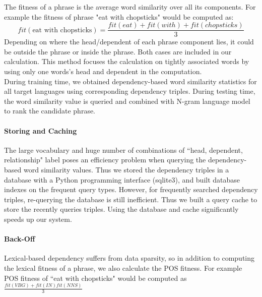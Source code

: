 \documentclass[11pt]{article}
\begin{document}
The fitness of a phrase is the average word similarity over all its components. For example the fitness of phrase "eat with chopsticks" would be computed as:
\begin{equation}
fit(\mbox{eat with chopsticks}) = \frac{fit(eat) + fit(with) + fit(chopsticks) } {3}
\end{equation}
Depending on where the head/dependent of each phrase component lies, it could be outside the phrase or inside the phrase. Both cases are included in our calculation. 
This method focuses the calculation on tightly associated words by using only one words's head and dependent in the computation.\\ 
During training time, we obtained dependency-based word similarity statistics for all target languages using corresponding dependency triples. During testing time, the word similarity value is queried and combined with N-gram language model to rank the candidate phrase. \\

\paragraph{Storing and Caching}
The large vocabulary and huge number of combinations of ``head, dependent, relationship" label poses an efficiency problem when querying the dependency-based word similarity values. Thus we stored the dependency triples in a database with a Python programming interface (sqlite3), and built database indexes on the frequent query types. However, for frequently searched dependency triples, re-querying the database is still inefficient. Thus we built a query cache to store the recently queries triples. Using the database and cache significantly speeds up our system. \\

\paragraph{Back-Off}
Lexical-based dependency suffers from data sparsity, so in addition to computing the lexical fitness of a phrase, we also calculate the POS fitness. For example POS fitness of ``eat with chopsticks" would be computed as\\
$  \frac{fit(VBG) + fit(IN) fit(NNS)}{3}  $\\


\end{document}
